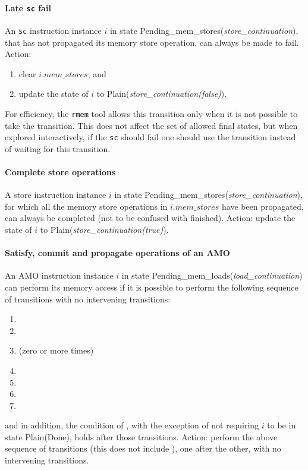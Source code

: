 \paragraph{Late {\tt sc} fail}\label{omm:late_sc_fail}
An {\tt sc} instruction instance $i$ in state {\sc Pending\_mem\_stores}({\it store\_continuation}), that has not propagated its memory store operation, can always be made to fail.
Action:
\begin{enumerate}
\item clear $i.\textit{mem\_stores}$; and
\item update the state of $i$ to {\sc Plain}({\it store\_continuation(false)}).
\end{enumerate}

\begin{commentary}
For efficiency, the {\tt rmem} tool allows this transition only when it is not possible to take the  transition.
This does not affect the set of allowed final states, but when explored interactively, if the {\tt sc} should fail one should use the  transition instead of waiting for this transition.
\end{commentary}

\paragraph{Complete store operations}\label{omm:complete_stores}
A store instruction instance $i$ in state {\sc Pending\_mem\_stores}({\it store\_continuation}), for which all the memory store operations in $i.\textit{mem\_stores}$ have been propagated, can always be completed (not to be confused with finished).
Action: update the state of $i$ to {\sc Plain}({\it store\_continuation(true)}).


\paragraph{Satisfy, commit and propagate operations of an AMO}\label{omm:do_amo}
An AMO instruction instance $i$ in state {\sc Pending\_mem\_loads}({\it load\_continuation}) can perform its memory access if it is possible to perform the following sequence of transitions with no intervening transitions:
\begin{enumerate}
\item {}
\item {}
\item {} (zero or more times)
\item {}
\item {}
\item {}
\item {}
\end{enumerate}
and in addition, the condition of , with the exception of not requiring $i$ to be in state {\sc Plain}({\sc Done}), holds after those transitions.
Action: perform the above sequence of transitions (this does not include ), one after the other, with no intervening transitions.

